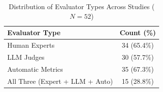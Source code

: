 
\begin{table}[tbp]
\centering
\small
\begin{tabular}{lc}
\toprule
\textbf{Evaluator Type} & \textbf{Count (\%)} \\
\midrule
Human Experts & 34 (65.4\%) \\
LLM Judges & 30 (57.7\%) \\
Automatic Metrics & 35 (67.3\%) \\
All Three (Expert + LLM + Auto) & 15 (28.8\%) \\
\bottomrule
\end{tabular}
\caption{Distribution of Evaluator Types Across Studies ($N=52$)}
\label{tab:evaluator-types}
\end{table}

